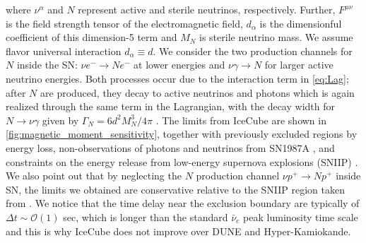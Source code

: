 \documentclass[aps,twocolumn,prl,showpacs,showkeys,preprintnumbers,superscriptaddress,nobibnotes,floatfix,longbibliography,notitlepage,nofootinbib]{revtex4-2}
\begin{document}
where $\nu^{\alpha}$ and $N$ represent active and sterile neutrinos, respectively. Further, $F^{\mu\nu}$ is the field strength tensor of the electromagnetic field, $d_\alpha$ is the dimensionful coefficient of this dimension-5 term and $M_N$ is sterile neutrino mass.  We assume flavor universal interaction $d_\alpha \equiv d$. We consider the two production channels for $N$ inside the SN: $\nu e^- \to N e^-$ at lower energies and $\nu \gamma \to N$ for larger active neutrino energies. Both processes occur due to the interaction term in \cref{eq:Lag}; after $N$ are produced, they decay to active neutrinos and photons which is again realized through the same term in the Lagrangian, with the decay width for $N\to\nu\gamma$ given by $\Gamma_N = 6d^2 M_N^3/4 \pi$ \cite{Plestid:2020vqf}. The limits from IceCube are shown in \cref{fig:magnetic_moment_sensitivity}, together with previously excluded regions by energy loss, non-observations of photons and neutrinos from SN1987A \cite{Brdar:2023tmi}, and constraints on the energy release from low-energy supernova explosions (SNIIP) \cite{PhysRevLett.128.221103, chauhan2024probing}. We also point out that by neglecting the $N$ production channel $\nu p^+\to N p^+$ inside SN, the limits we obtained are conservative relative to the SNIIP region taken from \cite{chauhan2024probing}. We notice that the time delay near the exclusion boundary are typically of $\Delta t \sim \mathcal{O}(1)$ sec, which is longer than the standard $\bar{\nu}_e$ peak luminosity time scale and this is why IceCube does not improve over DUNE and Hyper-Kamiokande. 
\end{document}
